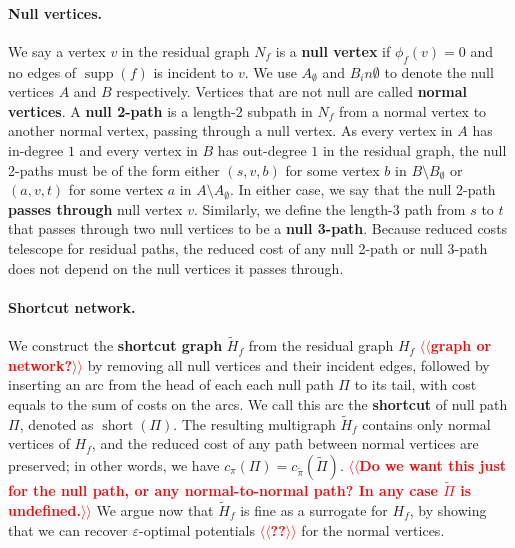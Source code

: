 \documentclass[11pt]{article}
\makeatletter
\def\eps{\varepsilon}
\def\fsupply{\phi}
\def\short{\operatorname{short}}
\def\supp{\operatorname{supp}}
\theoremstyle{plain}
\numberwithin{figure}{section}
\def\EMPH#1{\textbf{\boldmath #1}}
\def\n@te#1{\textsf{\boldmath \textbf{$\langle\!\langle$#1$\rangle\!\rangle$}}\leavevmode}
\def\note#1{\textcolor{red}{\n@te{#1}}}
\makeatother
\begin{document}
\paragraph{Null vertices.}
We say a vertex $v$ in the residual graph $N_f$ is a \EMPH{null vertex} if $\fsupply_f(v) = 0$ and no edges of $\supp(f)$ is incident to $v$.
We use $A_\emptyset$ and $B_in\emptyset$ to denote the null vertices  $A$ and
$B$ respectively.
Vertices that are not null are called \EMPH{normal vertices}.
%
A \EMPH{null 2-path} is a length-$2$ subpath in $N_f$ from a normal vertex to another normal vertex, passing through a null vertex.
As every vertex in $A$ has in-degree $1$ and every vertex in $B$ has out-degree $1$ in the residual graph, the null 2-paths must be of the form either $(s, v, b)$ for some vertex $b$ in $B \setminus B_\emptyset$ or $(a, v, t)$ for some vertex $a$ in $A \setminus A_\emptyset$.
In either case, we say that the null 2-path \EMPH{passes through} null vertex $v$.
%
Similarly, we define the length-$3$ path from $s$ to $t$ that passes through two null
vertices to be a \EMPH{null 3-path}.
%
Because reduced costs telescope for residual paths, the reduced cost of any null 2-path or null 3-path does not depend on the null vertices it passes through.

\paragraph{Shortcut network.}
We construct the \EMPH{shortcut graph} $\tilde{H}_f$ from the residual graph $H_f$ \note{graph or network?} by removing all
null vertices and their incident edges, followed by inserting an arc
from the head of each each null path $\Pi$ to its tail, with cost equals to the sum of costs on the arcs.
We call this arc the \EMPH{shortcut} of null path $\Pi$, denoted as \EMPH{$\short(\Pi)$}.
%
The resulting multigraph $\tilde{H}_f$ contains only normal vertices of $H_f$, and the reduced cost of any path between normal vertices are preserved;
in other words, we have $c_\pi(\Pi) = c_{\tilde\pi}(\tilde{\Pi})$. \note{Do we want this just for the null path, or any normal-to-normal path?  In any case $\tilde{\Pi}$ is undefined.}
We argue now that $\tilde{H}_f$ is fine as a surrogate for $H_f$, by showing
that we can recover $\eps$-optimal potentials \note{??} for the normal vertices.
\end{document}
